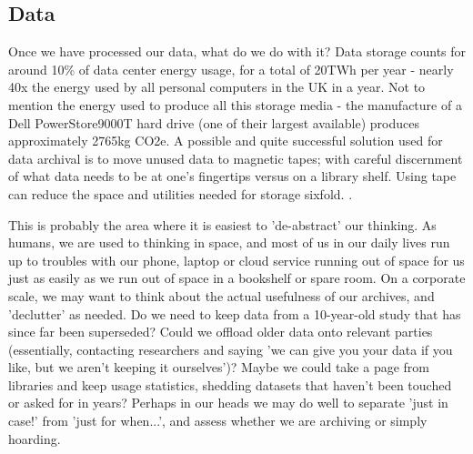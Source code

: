 \documentclass{article}
\begin{document}
\subsection{Data}
Once we have processed our data, what do we do with it? Data storage counts for around 10\% of data center energy usage, for a total of 20TWh per year \citep{shehabi2016united} - nearly 40x the energy used by all personal computers in the UK in a year.  \citep{waters2019energy} Not to mention the energy used to produce all this storage media - the manufacture of a Dell PowerStore9000T hard drive (one of their largest available) produces approximately 2765kg CO2e. \citep{dell2021powerstore} A possible and quite successful solution used for data archival is to move unused data to magnetic tapes; with careful discernment of what data needs to be at one's fingertips versus on a library shelf. Using tape can reduce the space and utilities needed for storage sixfold. \citep{moore2007disk}. \newline

This is probably the area where it is easiest to 'de-abstract' our thinking. As humans, we are used to thinking in space, and most of us in our daily lives run up to troubles with our phone, laptop or cloud service running out of space for us just as easily as we run out of space in a bookshelf or spare room. On a corporate scale, we may want to think about the actual usefulness of our archives, and 'declutter' as needed. Do we need to keep data from a 10-year-old study that has since far been superseded? Could we offload older data onto relevant parties (essentially, contacting researchers and saying 'we can give you your data if you like, but we aren't keeping it ourselves')? Maybe we could take a page from libraries and keep usage statistics, shedding datasets that haven't been touched or asked for in years? Perhaps in our heads we may do well to separate 'just in case!' from 'just for when...', and assess whether we are archiving or simply hoarding.
\end{document}
